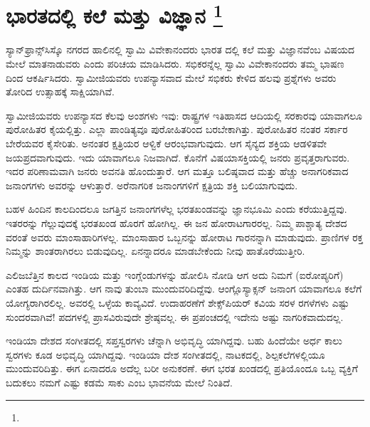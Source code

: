 
\chapter[ಭಾರತದಲ್ಲಿ ಕಲೆ ಮತ್ತು ವಿಜ್ಞಾನ ]{ಭಾರತದಲ್ಲಿ ಕಲೆ ಮತ್ತು ವಿಜ್ಞಾನ \protect\footnote{}}

ಸ್ಯಾನ್​ಫ್ರಾನ್ಸ್​ಸಿಸ್ಕೊ ನಗರದ ಹಾಲಿನಲ್ಲಿ ಸ್ವಾಮಿ ವಿವೇಕಾನಂದರು ಭಾರತ ದಲ್ಲಿ ಕಲೆ ಮತ್ತು ವಿಜ್ಞಾನವೆಂಬ ವಿಷಯದ ಮೇಲೆ ಮಾತನಾಡುವರು ಎಂದು ಪರಿಚಯ ಮಾಡಿಸಿದರು. ಸಭಿಕರನ್ನೆಲ್ಲ ಸ್ವಾಮಿ ವಿವೇಕಾನಂದರು ತಮ್ಮ ಭಾಷಣ ದಿಂದ ಆಕರ್ಷಿಸಿದರು. ಸ್ವಾಮೀಜಿಯವರು ಉಪನ್ಯಾಸವಾದ ಮೇಲೆ ಸಭಿಕರು ಕೇಳಿದ ಹಲವು ಪ್ರಶ್ನೆಗಳು ಅವರು ತೋರಿದ ಉತ್ಸಾಹಕ್ಕೆ ಸಾಕ್ಷಿಯಾಗಿವೆ.

ಸ್ವಾಮೀಜಿಯವರು ಉಪನ್ಯಾಸದ ಕೆಲವು ಅಂಶಗಳು ಇವು: ರಾಷ್ಟ್ರಗಳ ಇತಿಹಾಸದ ಆದಿಯಲ್ಲಿ ಸರಕಾರವು ಯಾವಾಗಲೂ ಪುರೋಹಿತರ ಕೈಯಲ್ಲಿತ್ತು. ಎಲ್ಲಾ ಪಾಂಡಿತ್ಯವೂ ಪುರೋಹಿತರಿಂದ ಬರಬೇಕಾಗಿತ್ತು. ಪುರೋಹಿತರ ನಂತರ ಸರ್ಕಾರ ಬೇರೆಯವರ ಕೈಸೇರಿತು. ಅನಂತರ ಕ್ಷತ್ರಿಯರ ಆಳ್ವಿಕೆ ಆರಂಭವಾಗುವುದು. ಆಗ ಸೈನ್ಯದ ಶಕ್ತಿಯ ಆಡಳಿತವೇ ಜಯಪ್ರದವಾಗುವುದು. ಇದು ಯಾವಾಗಲೂ ನಿಜವಾಗಿದೆ. ಕೊನೆಗೆ ವಿಷಯಾಸಕ್ತಿಯಲ್ಲಿ ಜನರು ಪ್ರವೃತ್ತರಾಗುವರು. ಇದರ ಪರಿಣಾಮವಾಗಿ ಜನರು ಅವನತಿ ಹೊಂದುತ್ತಾರೆ. ಆಗ ಮತ್ತೂ ಬಲಿಷ್ಠವಾದ ಮತ್ತು ಹೆಚ್ಚು ಅನಾಗರಿಕವಾದ ಜನಾಂಗಗಳು ಅವರನ್ನು ಆಳುತ್ತಾರೆ. ಅರೆನಾಗರಿಕ ಜನಾಂಗಗಳಿಗೆ ಕ್ಷತ್ರಿಯ ಶಕ್ತಿ ಬಲಿಯಾಗುವುದು.

ಬಹಳ ಹಿಂದಿನ ಕಾಲದಿಂದಲೂ ಜಗತ್ತಿನ ಜನಾಂಗಗಳೆಲ್ಲ ಭರತಖಂಡವನ್ನು ಜ್ಞಾನಭೂಮಿ ಎಂದು ಕರೆಯುತ್ತಿದ್ದವು. ಇತರರನ್ನು ಗೆಲ್ಲುವುದಕ್ಕೆ ಭರತಖಂಡ ಹೊರಗೆ ಹೋಗಿಲ್ಲ. ಈ ಜನ ಹೋರಾಟಗಾರರಲ್ಲ. ನಿಮ್ಮ ಪಾಶ್ಚಾತ್ಯ ದೇಶದ ವರಂತೆ ಅವರು ಮಾಂಸಾಹಾರಿಗಳಲ್ಲ. ಮಾಂಸಾಹಾರ ಒಬ್ಬನನ್ನು ಹೋರಾಟ ಗಾರನನ್ನಾಗಿ ಮಾಡುವುದು. ಪ್ರಾಣಿಗಳ ರಕ್ತ ನಿಮ್ಮನ್ನು ಶಾಂತರಾಗಿರಲು ಬಿಡುವುದಿಲ್ಲ. ಏನನ್ನಾದರೂ ಮಾಡಬೇಕೆಂದು ನೀವು ಹಾತೊರೆಯುತ್ತೀರಿ.

ಎಲಿಜಬೆತ್ತಿನ ಕಾಲದ ಇಂಡಿಯ ಮತ್ತು ಇಂಗ್ಲೆಂಡುಗಳನ್ನು ಹೋಲಿಸಿ ನೋಡಿ ಆಗ ಅದು ನಿಮಗೆ (ಐರೋಪ್ಯರಿಗೆ) ಎಂತಹ ದುರ್ದಿನವಾಗಿತ್ತು. ಆಗ ನಾವು ತುಂಬಾ ಮುಂದುವರಿದಿದ್ದೆವು. ಆಂಗ್ಲೊಸ್ಯಾಕ್ಸನ್​ ಜನಾಂಗ ಯಾವಾಗಲೂ ಕಲೆಗೆ ಯೋಗ್ಯರಾಗಿರಲಿಲ್ಲ. ಅವರಲ್ಲಿ ಒಳ್ಳೆಯ ಕಾವ್ಯವಿದೆ. ಉದಾಹರಣೆಗೆ ಶೇಕ್ಸ್​ಪಿಯರ್​ ಕವಿಯ ಸರಳ ರಗಳೆಗಳು ಎಷ್ಟು ಸುಂದರವಾಗಿವೆ! ಪದಗಳಲ್ಲಿ ಪ್ರಾಸವಿರುವುದೇ ಶ್ರೇಷ್ಠವಲ್ಲ. ಈ ಪ್ರಪಂಚದಲ್ಲಿ ಇದೇನು ಅಷ್ಟು ನಾಗರಿಕವಾದುದಲ್ಲ.

ಇಂಡಿಯಾ ದೇಶದ ಸಂಗೀತದಲ್ಲಿ ಸಪ್ತಸ್ವರಗಳು ಚೆನ್ನಾಗಿ ಅಭಿವೃದ್ಧಿ ಯಾಗಿದ್ದವು. ಬಹು ಹಿಂದೆಯೇ ಅರ್ಧ ಕಾಲು ಸ್ವರಗಳು ಕೂಡ ಅಭಿವೃದ್ಧಿ ಯಾಗಿದ್ದವು. ಇಂಡಿಯಾ ದೇಶ ಸಂಗೀತದಲ್ಲಿ, ನಾಟಕದಲ್ಲಿ, ಶಿಲ್ಪಕಲೆಗಳಲ್ಲಿಯೂ ಮುಂದುವರಿದಿತ್ತು. ಈಗ ಏನಾದರೂ ಅದೆಲ್ಲ ಬರೀ ಅನುಕರಣೆ. ಈಗ ಭರತ ಖಂಡದಲ್ಲಿ ಪ್ರತಿಯೊಂದೂ ಒಬ್ಬ ವ್ಯಕ್ತಿಗೆ ಬದುಕಲು ನಮಗೆ ಎಷ್ಟು ಕಡಮೆ ಸಾಕು ಎಂಬ ಭಾವನೆಯ ಮೇಲೆ ನಿಂತಿದೆ.

